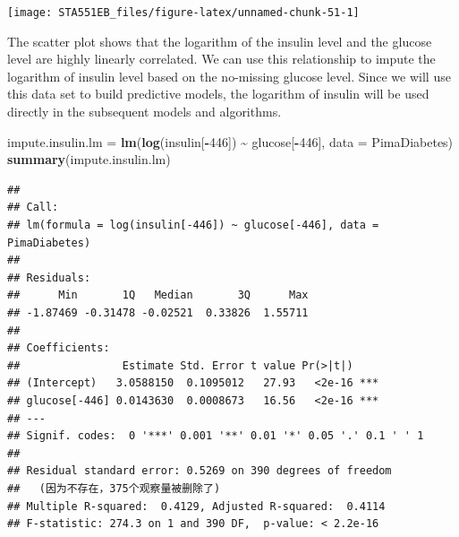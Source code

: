 \documentclass[
]{book}
\newenvironment{Shaded}{\begin{snugshade}}{\end{snugshade}}
\newcommand{\AttributeTok}[1]{\textcolor[rgb]{0.13,0.29,0.53}{#1}}
\newcommand{\DecValTok}[1]{\textcolor[rgb]{0.00,0.00,0.81}{#1}}
\newcommand{\FunctionTok}[1]{\textcolor[rgb]{0.13,0.29,0.53}{\textbf{#1}}}
\newcommand{\NormalTok}[1]{#1}
\newcommand{\OtherTok}[1]{\textcolor[rgb]{0.56,0.35,0.01}{#1}}
\newcommand{\SpecialCharTok}[1]{\textcolor[rgb]{0.81,0.36,0.00}{\textbf{#1}}}
\newcommand{\StringTok}[1]{\textcolor[rgb]{0.31,0.60,0.02}{#1}}
\begin{document}
\begin{Shaded}
\end{Shaded}

\begin{center}\texttt{[image: STA551EB\_files/figure-latex/unnamed-chunk-51-1]} \end{center}

The scatter plot shows that the logarithm of the insulin level and the glucose level are highly linearly correlated. We can use this relationship to impute the logarithm of insulin level based on the no-missing glucose level. Since we will use this data set to build predictive models, the logarithm of insulin will be used directly in the subsequent models and algorithms.

\begin{Shaded}
\begin{Highlighting}[]
\NormalTok{impute.insulin.lm }\OtherTok{=} \FunctionTok{lm}\NormalTok{(}\FunctionTok{log}\NormalTok{(insulin[}\SpecialCharTok{{-}}\DecValTok{446}\NormalTok{]) }\SpecialCharTok{\textasciitilde{}}\NormalTok{ glucose[}\SpecialCharTok{{-}}\DecValTok{446}\NormalTok{], }\AttributeTok{data =}\NormalTok{ PimaDiabetes)}
\FunctionTok{summary}\NormalTok{(impute.insulin.lm)}
\end{Highlighting}
\end{Shaded}

\begin{verbatim}
## 
## Call:
## lm(formula = log(insulin[-446]) ~ glucose[-446], data = PimaDiabetes)
## 
## Residuals:
##      Min       1Q   Median       3Q      Max 
## -1.87469 -0.31478 -0.02521  0.33826  1.55711 
## 
## Coefficients:
##                Estimate Std. Error t value Pr(>|t|)    
## (Intercept)   3.0588150  0.1095012   27.93   <2e-16 ***
## glucose[-446] 0.0143630  0.0008673   16.56   <2e-16 ***
## ---
## Signif. codes:  0 '***' 0.001 '**' 0.01 '*' 0.05 '.' 0.1 ' ' 1
## 
## Residual standard error: 0.5269 on 390 degrees of freedom
##   (因为不存在，375个观察量被删除了)
## Multiple R-squared:  0.4129, Adjusted R-squared:  0.4114 
## F-statistic: 274.3 on 1 and 390 DF,  p-value: < 2.2e-16
\end{verbatim}
\end{document}
